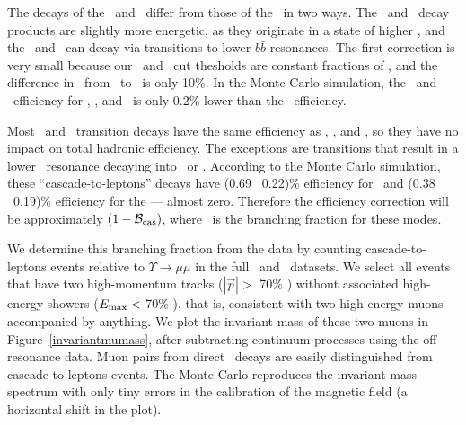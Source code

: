 \documentclass{cornell}
\begin{document}
The decays of the \uss\ and \usss\ differ from those of the \us\ in
two ways.  The \uss\ and \usss\ decay products are slightly more
energetic, as they originate in a state of higher \ecm, and the \uss\
and \usss\ can decay via transitions to lower $b\bar{b}$ resonances.
The first correction is very small because our \pmax\ and \visen\ cut
thesholds are constant fractions of \ecm, and the difference in \ecm\
from \us\ to \usss\ is only 10\%.  In the Monte Carlo simulation, the
\uss\ and \usss\ efficiency for \ggg, \gggamma, and \qqbar\ is only
0.2\% lower than the \us\ efficiency.

Most \uss\ and \usss\ transition decays have the same efficiency as
\ggg, \gggamma, and \qqbar, so they have no impact on total hadronic
efficiency.  The exceptions are transitions that result in a lower
\ups\ resonance decaying into \ee\ or \mumu.  According to the Monte
Carlo simulation, these ``cascade-to-leptons'' decays have (0.69 \PM\
0.22)\% efficiency for \uss\ and (0.38 \PM\ 0.19)\% efficiency for the
\usss--- almost zero.  Therefore the efficiency correction will be
approximately $(1 - {\mathcal B}_{\mbox{\scriptsize cas}})$, where \bcas\ is the
branching fraction for these modes.

We determine this branching fraction from the data by counting
cascade-to-leptons events relative to $\Upsilon \to \mu\mu$ in the
full \uss\ and \usss\ datasets.  We select all events that have two
high-momentum tracks ($|\vec{p}| >$ 70\% \ebeam) without associated
high-energy showers ($E_{\mbox{\scriptsize max}} <$ 70\% \ebeam), that is,
consistent with two high-energy muons accompanied by anything.  We
plot the invariant mass of these two muons in Figure~\ref{invariantmumass}, after subtracting continuum processes using the
off-resonance data.  Muon pairs from direct \ups\ decays are easily
distinguished from cascade-to-leptons events.  The Monte Carlo
reproduces the invariant mass spectrum with only tiny errors in the
calibration of the magnetic field (a horizontal shift in the plot).
\end{document}
